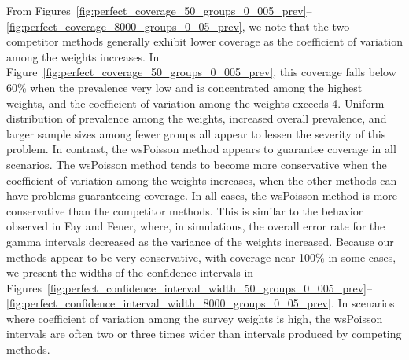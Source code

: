 \documentclass[AMA,STIX1COL]{WileyNJD-v2}
\begin{document}
From Figures~\ref{fig:perfect_coverage_50_groups_0_005_prev}--\ref{fig:perfect_coverage_8000_groups_0_05_prev}, we note that the two competitor methods generally exhibit lower coverage as the coefficient of variation among the weights increases.
In Figure~\ref{fig:perfect_coverage_50_groups_0_005_prev}, this coverage falls below 60\% when the prevalence very low and is concentrated among the highest weights, and the coefficient of variation among the weights exceeds 4.
Uniform distribution of prevalence among the weights, increased overall prevalence, and larger sample sizes among fewer groups all appear to lessen the severity of this problem.
In contrast, the wsPoisson method appears to guarantee coverage in all scenarios. The wsPoisson method tends to become more conservative when the coefficient of variation among the weights increases, when the other methods can have problems guaranteeing coverage. 
In all cases, the wsPoisson method is more conservative than the competitor methods.
This is similar to the behavior observed in Fay and Feuer\cite{FayF:1997}, where, in simulations, the overall error rate for the gamma intervals decreased as the variance of the weights increased.
Because our methods appear to be very conservative, with coverage near 100\% in some cases, we present the widths of the confidence intervals in Figures~\ref{fig:perfect_confidence_interval_width_50_groups_0_005_prev}--\ref{fig:perfect_confidence_interval_width_8000_groups_0_05_prev}.
In scenarios where coefficient of variation among the survey weights is high, the wsPoisson intervals are often two or three times wider than intervals produced by competing methods.
\end{document}
